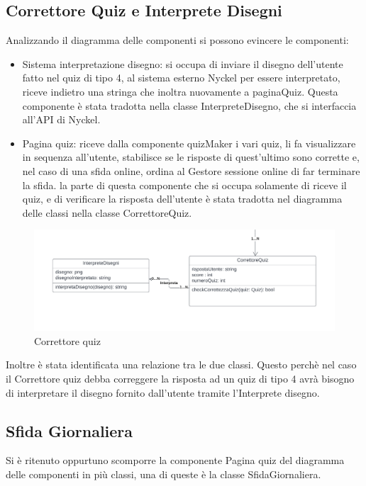 \subsection{Correttore Quiz e Interprete Disegni}
Analizzando il diagramma delle componenti si possono evincere le componenti:
\begin{itemize}
    \item Sistema interpretazione disegno: si occupa di inviare il disegno dell'utente fatto nel quiz di tipo 4, al sistema esterno Nyckel per essere interpretato, riceve indietro una stringa che inoltra nuovamente a paginaQuiz. Questa componente è stata tradotta nella classe InterpreteDisegno, che si interfaccia all'API di Nyckel.
    \item Pagina quiz: riceve dalla componente quizMaker i vari quiz, li fa visualizzare in sequenza all'utente, stabilisce se le risposte di quest'ultimo sono corrette e, nel caso di una sfida online, ordina al Gestore sessione online di far terminare la sfida. la parte di questa componente che si occupa solamente di riceve il quiz, e di verificare la risposta dell'utente è stata tradotta nel diagramma delle classi nella classe CorrettoreQuiz.\\
\end{itemize}
\noindent

\begin{figure}[!h]
\centering
\includegraphics[scale=0.10]{images/classe_correttore_quiz_interprete_disegni.png}
\caption{Correttore quiz}
\label{fig:classe_correttore_quiz}
\end{figure}
\noindent
Inoltre è stata identificata una relazione tra le due classi. Questo perchè nel caso il Correttore quiz debba correggere la risposta ad un quiz di tipo 4 avrà bisogno di interpretare il disegno fornito dall'utente tramite l'Interprete disegno.

\subsection{Sfida Giornaliera}
Si è ritenuto oppurtuno scomporre la componente Pagina quiz del diagramma delle componenti in più classi, una di queste è la classe SfidaGiornaliera.

